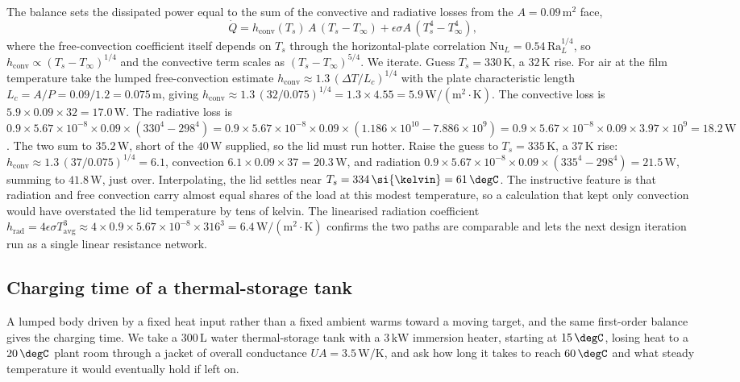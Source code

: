 The balance sets the dissipated power equal to the sum of the convective and
radiative losses from the $A = 0.09\,\text{m}^2$ face,
\[
\dot{Q} = h_{\text{conv}}(T_s)\,A\,(T_s - T_\infty) + \epsilon\sigma A
\,(T_s^4 - T_\infty^4),
\]
where the free-convection coefficient itself depends on $T_s$ through the
horizontal-plate correlation $\text{Nu}_L = 0.54\,\text{Ra}_L^{1/4}$, so
$h_{\text{conv}} \propto (T_s - T_\infty)^{1/4}$ and the convective term scales
as $(T_s - T_\infty)^{5/4}$. We iterate. Guess $T_s = 330\,\si{\kelvin}$, a
$32\,\si{\kelvin}$ rise. For air at the film temperature take the lumped
free-convection estimate $h_{\text{conv}} \approx 1.3\,(\Delta T/L_c)^{1/4}$
with the plate characteristic length $L_c = A/P = 0.09/1.2 = 0.075\,\text{m}$,
giving $h_{\text{conv}} \approx 1.3\,(32/0.075)^{1/4} = 1.3 \times 4.55 =
5.9\,\text{W}/(\text{m}^2\cdot\si{\kelvin})$. The convective loss is $5.9 \times
0.09 \times 32 = 17.0\,\text{W}$. The radiative loss is $0.9 \times 5.67
\times10^{-8} \times 0.09 \times (330^4 - 298^4) = 0.9 \times 5.67\times10^{-8}
\times 0.09 \times (1.186\times10^{10} - 7.886\times10^{9}) = 0.9 \times 5.67
\times10^{-8}\times 0.09 \times 3.97\times10^{9} = 18.2\,\text{W}$. The two sum
to $35.2\,\text{W}$, short of the $40\,\text{W}$ supplied, so the lid must run
hotter. Raise the guess to $T_s = 335\,\si{\kelvin}$, a $37\,\si{\kelvin}$ rise:
$h_{\text{conv}} \approx 1.3\,(37/0.075)^{1/4} = 6.1$, convection $6.1 \times
0.09 \times 37 = 20.3\,\text{W}$, and radiation $0.9 \times 5.67\times10^{-8}
\times 0.09\times(335^4 - 298^4) = 21.5\,\text{W}$, summing to
$41.8\,\text{W}$, just over. Interpolating, the lid settles near $T_s =
334\,\si{\kelvin} = 61\,\degC$. The instructive feature is that radiation and
free convection carry almost equal shares of the load at this modest
temperature, so a calculation that kept only convection would have overstated
the lid temperature by tens of kelvin. The linearised radiation coefficient
$h_{\text{rad}} = 4\epsilon\sigma T_{\text{avg}}^3 \approx 4\times 0.9 \times
5.67\times10^{-8}\times 316^3 = 6.4\,\text{W}/(\text{m}^2\cdot\si{\kelvin})$
confirms the two paths are comparable and lets the next design iteration run as
a single linear resistance network.

\subsection{Charging time of a thermal-storage tank}

A lumped body driven by a fixed heat input rather than a fixed ambient warms
toward a moving target, and the same first-order balance gives the charging
time. We take a $300\,\text{L}$ water thermal-storage tank with a
$3\,\text{kW}$ immersion heater, starting at $15\,\degC$, losing heat to a
$20\,\degC$ plant room through a jacket of overall conductance $UA =
3.5\,\text{W}/\si{\kelvin}$, and ask how long it takes to reach $60\,\degC$ and
what steady temperature it would eventually hold if left on.

